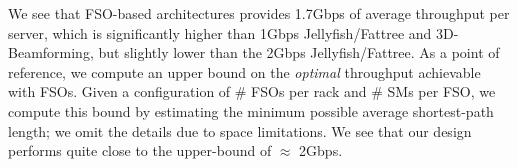 \begin{figure}[t]
\vspace{-0.3cm}
\begin{center}
\end{center}
\vspace{-0.3cm}
\label{fig:sms}
\end{figure}

We see that FSO-based architectures provides 1.7Gbps of average
throughput per server, which is significantly higher than 1Gbps
Jellyfish/Fattree and 3D-Beamforming, but slightly lower than the
2Gbps Jellyfish/Fattree.  As a point of reference, we compute an
upper bound on the {\em optimal} throughput achievable with FSOs. Given
a configuration of \# FSOs per rack and \# SMs per FSO, we compute
this bound by estimating the minimum possible average shortest-path
length; we omit the details due to space limitations. We see that our
design performs quite close to the upper-bound of $\approx$ 2Gbps.

